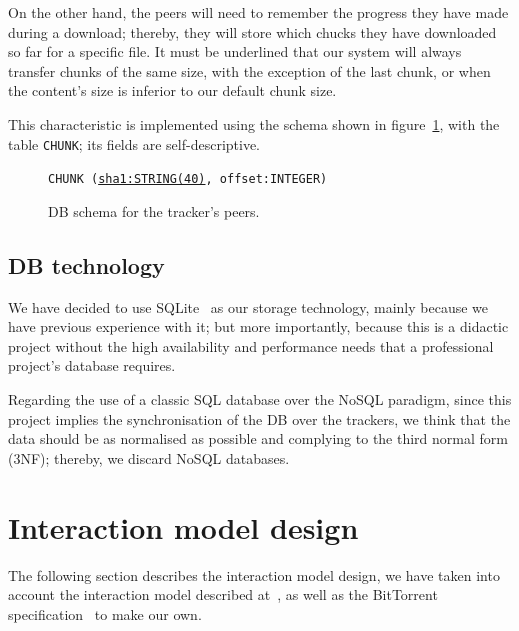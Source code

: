 \documentclass[twoside,a4paper,10pt]{article}
\begin{document}
On the other hand, the peers will need to remember the
progress they have made during a download; thereby, they will store which chucks
they have downloaded so far for a specific file. It must be underlined that our
system will always transfer chunks of the same size, with the exception of the
last chunk, or when the content's size is inferior to our default chunk size.

This characteristic is implemented using the schema shown in
figure~\ref{fig:schema-P}, with the table \texttt{CHUNK}; its
fields are self-descriptive.

\begin{figure}[h]
  \centering
  \texttt{CHUNK (\underline{sha1:STRING(40)}, offset:INTEGER)}
  
  \centering
  \caption{\label{fig:schema-P}DB schema for the tracker's peers.}
\end{figure}

\subsection{DB technology}

We have decided to use SQLite~\cite{sqlite} as our storage technology,
mainly because we have previous experience with it; but more importantly,
because this is a didactic project without the high availability and performance
needs that a professional project's database requires.

Regarding the use of a classic SQL database over the NoSQL paradigm, since
this project implies the synchronisation of the DB over the trackers, we think
that the data should be as normalised as possible and complying to the third
normal form (3NF); thereby, we discard NoSQL databases.

\section{Interaction model design}

The following section describes the interaction model design, we have taken
into account the interaction model described at~\cite{libtorrent,bittheory},
as well as the BitTorrent specification~\cite{bep03,bep15,bep23} to make our
own.
\end{document}
